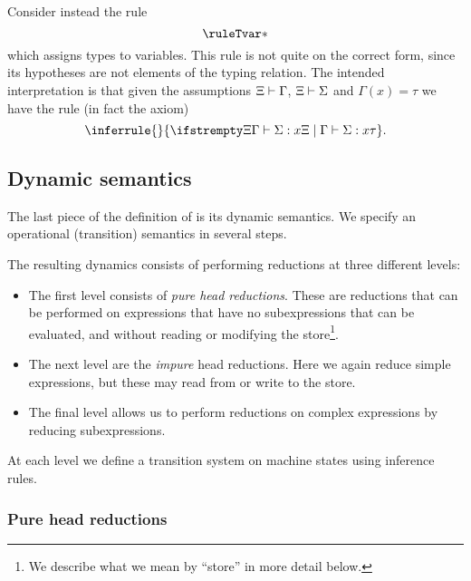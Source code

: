 Consider instead the rule
%
\begin{equation*}
    \ruleTvar*
\end{equation*}
%
which assigns types to variables. This rule is not quite on the correct form, since its hypotheses are not elements of the typing relation. The intended interpretation is that given the assumptions $\Xi \vdash \Gamma$, $\Xi \vdash \Sigma$ and $\Gamma(x) = \tau$ we have the rule (in fact the axiom)
%
\begin{equation*}
    \inferrule{ }{
        \typerel{\Xi}{\Gamma}{\Sigma}{x}{\tau}
    }.
\end{equation*}


\subsection{Dynamic semantics}\label{sec:dynamic-semantics}

The last piece of the definition of \langrecref{} is its dynamic semantics. We specify an operational (transition) semantics in several steps.

The resulting dynamics consists of performing reductions at three different levels:
%
\begin{itemize}
    \item The first level consists of \emph{pure head reductions}. These are reductions that can be performed on expressions that have no subexpressions that can be evaluated, and without reading or modifying the store\footnote{We describe what we mean by \enquote{store} in more detail below.}.
    
    \item The next level are the \emph{impure} head reductions. Here we again reduce simple expressions, but these may read from or write to the store.

    \item The final level allows us to perform reductions on complex expressions by reducing subexpressions.
\end{itemize}
%
At each level we define a transition system on machine states using inference rules.


\subsubsection{Pure head reductions}\label{sec:pure-head-red}

